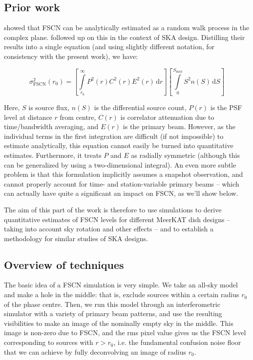 \documentclass{aa}
\begin{document}
\subsection{Prior work}

\citet[][see Appendix B]{VLA146} showed that FSCN can be analytically estimated as a random walk process in the complex plane. \citet[][]{SKA54-expa,SKA54} followed up on this in the context of SKA design. Distilling their results into a single equation (and using slightly different notation, for consistency with the present work), we have:

\newcommand{\DD}[1]{\,\mathrm{d}{#1}}

\begin{equation}
\label{eq:fscn}
  \sigma^2_\mathrm{FSCN}(r_0) = \left [ \int\limits_{r_0}^{\infty} P^2(r)C^2(r)E^2(r) \DD{r} \right ]
\left[ \int\limits_{0}^{S_\mathrm{max}} S^2n(S)\DD{S}\right ] 
\end{equation}

Here, $S$ is source flux, $n(S)$ is the differential source count, $P(r)$ is the PSF level at distance $r$ from centre, $C(r)$ is correlator attenuation due to time/bandwidth averaging, and $E(r)$ is the primary beam. However, as the individual terms in the first integration are difficult (if not impossible) to estimate analytically, this equation cannot easily be turned into quantitative estimates. Furthermore, it treats $P$ and $E$ as radially symmetric (although this can be generalized by using a two-dimensional integral). An even more subtle problem is that this formulation implicitly assumes a snapshot observation, and cannot properly account for time- and station-variable primary beams -- which can actually have quite a significant an impact on FSCN, as we'll show below.

The aim of this part of the work is therefore to use simulations to derive quantitative estimates of FSCN levels for different MeerKAT dish designs -- taking into account sky rotation and other effects -- and to establish a methodology for similar studies of SKA designs.

\subsection{Overview of techniques}

The basic idea of a FSCN simulation is very simple. We take an all-sky model and make a hole in the middle: that is, exclude sources within a certain radius $r_0$ of the phase centre. Then, we run this model through an interferometric simulator with a variety of primary beam patterns, and use the resulting visibilities to make an image of the nominally empty sky in the middle. This image is non-zero due to FSCN, and the rms pixel value gives us the FSCN level corresponding to sources with $r>r_0$, i.e. the fundamental confusion noise floor that we can achieve by fully deconvolving an image of radius $r_0$.
\end{document}

